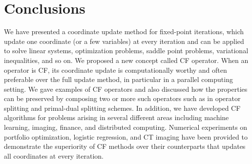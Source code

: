 \section{Conclusions}
We have presented a coordinate update method for fixed-point iterations, which update one coordinate (or a few variables) at every iteration and can be applied to solve linear systems, optimization problems, saddle point problems, variational inequalities, and so on. We proposed a new concept called CF operator. When an operator is CF, its coordinate update is computationally worthy and often preferable over the full update method, in particular in a parallel computing setting. We gave examples of CF operators and also discussed how the properties can be preserved by composing two or more such operators such as in operator splitting and primal-dual splitting schemes. In addition, we have developed CF algorithms for problems arising in several different areas including machine learning, imaging, finance, and distributed computing. Numerical experiments on portfolio optimization, logistic regression, and CT imaging have been provided to demonstrate the superiority of CF methods over their counterparts that updates all coordinates at every iteration. 
